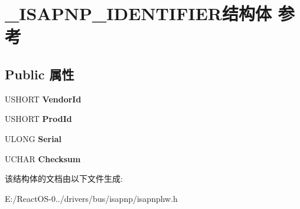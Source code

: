 \hypertarget{struct___i_s_a_p_n_p___i_d_e_n_t_i_f_i_e_r}{}\section{\+\_\+\+I\+S\+A\+P\+N\+P\+\_\+\+I\+D\+E\+N\+T\+I\+F\+I\+E\+R结构体 参考}
\label{struct___i_s_a_p_n_p___i_d_e_n_t_i_f_i_e_r}
\subsection*{Public 属性}
\begin{DoxyCompactItemize}
\item 
\mbox{\label{struct___i_s_a_p_n_p___i_d_e_n_t_i_f_i_e_r_aa60a2fe57931d801bea116602c800261}} 
U\+S\+H\+O\+RT {\bfseries Vendor\+Id}
\item 
\mbox{\label{struct___i_s_a_p_n_p___i_d_e_n_t_i_f_i_e_r_acdf372ec1312cfae3bffa259a441cb7a}} 
U\+S\+H\+O\+RT {\bfseries Prod\+Id}
\item 
\mbox{\label{struct___i_s_a_p_n_p___i_d_e_n_t_i_f_i_e_r_aade74ef656b77820497f4b9b4862de32}} 
U\+L\+O\+NG {\bfseries Serial}
\item 
\mbox{\label{struct___i_s_a_p_n_p___i_d_e_n_t_i_f_i_e_r_a320b0baff269354ce24156b81b35855c}} 
U\+C\+H\+AR {\bfseries Checksum}
\end{DoxyCompactItemize}


该结构体的文档由以下文件生成\+:\begin{DoxyCompactItemize}
\item 
E\+:/\+React\+O\+S-\/0../drivers/bus/isapnp/isapnphw.\+h\end{DoxyCompactItemize}
